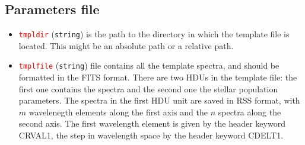 \documentclass[usenatbib,usegraphicx,useAMS,onecolumn]{mn2e}
\newcommand{\codeline}[1]{\lstinline|#1|}
\newcommand{\paramdef}[1]{\textcolor{red}{\codeline{#1}}}
\begin{document}
\subsection{Parameters file}
\label{subsec:ssp_param}
\begin{itemize}
    \item \paramdef{tmpldir} (\texttt{string}) is the path to the directory in which the template file is located.
        This might be an absolute path or a relative path.
    \item \paramdef{tmplfile} (\texttt{string}) file contains all the template spectra, and should be formatted in the FITS format.
        There are two HDUs in the template file: the first one contains the spectra and the second one the stellar population parameters.
        The spectra in the first HDU unit are saved in RSS format, with $m$ wavelenegth elements along the first axis and the $n$ spectra along the second axis.
        The first wavelength element is given by the header keyword \textsc{CRVAL1}, the step in wavelength space by the header keyword \textsc{CDELT1}.
        

\end{itemize}
\end{document}
